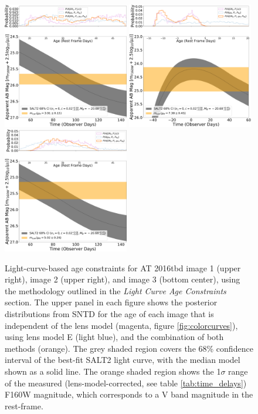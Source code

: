 \documentclass[12pt]{article}
\def\SNABC{AT 2016tbd\xspace}
\begin{document}
\begin{figure}
    \centering
    \includegraphics[width=0.49\textwidth]{Paper/Figures/lightcurve_image1.pdf}
    \includegraphics[width=0.49\textwidth]{Paper/Figures/lightcurve_image2.pdf}
    \includegraphics[width=0.49\textwidth]{Paper/Figures/lightcurve_image3.pdf}
    \caption{Light-curve-based age constraints for \SNABC image 1 (upper right), image 2 (upper right), and image 3 (bottom center), using the methodology outlined in the \textit{Light Curve Age Constraints} section. The upper panel in each figure shows the posterior distributions from SNTD for the age of each image that is independent of the lens model (magenta, figure \ref{fig:colorcurves}), using lens model E (light blue), and the combination of both methods (orange). The grey shaded region covers the 68\% confidence interval of the best-fit SALT2 light curve, with the median model shown as a solid line. The orange shaded region shows the 1$\sigma$ range of the measured (lens-model-corrected, see table \ref{tab:time_delays}) F160W magnitude, which corresponds to a V band magnitude in the rest-frame.}
    \label{fig:lightcurves}
\end{figure}
\end{document}
